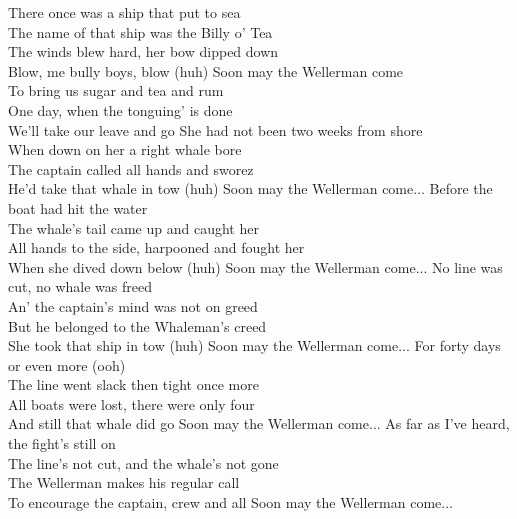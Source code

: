 There once was a ship that put to sea\\
The name of that ship was the Billy o' Tea\\
The winds blew hard, her bow dipped down\\
Blow, me bully boys, blow (huh)
\hops
{} Soon may the Wellerman come \\
 To bring us sugar and tea and rum \\
 One day, when the tonguing' is done\\
 We'll take our leave and go 
\hops
She had not been two weeks from shore\\
When down on her a right whale bore\\
The captain called all hands and sworez\\
He'd take that whale in tow (huh)
\hops
{} Soon may the Wellerman come...
\hops
Before the boat had hit the water\\
The whale's tail came up and caught her\\
All hands to the side, harpooned and fought her\\
When she dived down below (huh)
\hops
{} Soon may the Wellerman come...
\hops
No line was cut, no whale was freed\\
An' the captain's mind was not on greed\\
But he belonged to the Whaleman's creed\\
She took that ship in tow (huh)
\hops
{} Soon may the Wellerman come...
\hops
For forty days or even more (ooh)\\
The line went slack then tight once more\\
All boats were lost, there were only four\\
And still that whale did go
\hops
{} Soon may the Wellerman come...
\hops
As far as I've heard, the fight's still on\\
The line's not cut, and the whale's not gone\\
The Wellerman makes his regular call\\
To encourage the captain, crew and all
\hops
{} Soon may the Wellerman come...